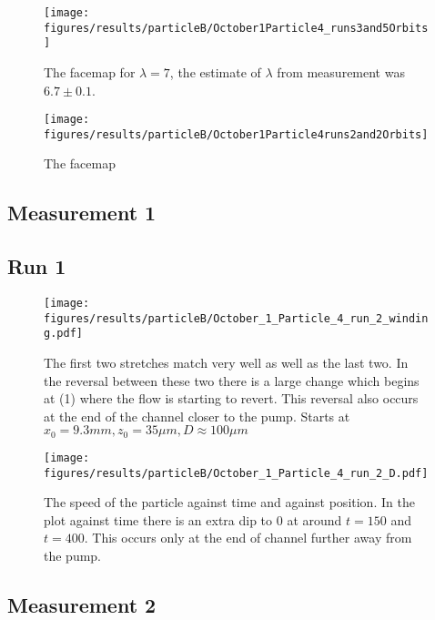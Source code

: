 


\begin{figure}[H]
\centering
\texttt{[image: figures/results/particleB/October1Particle4\_runs3and5Orbits]}
\caption{The facemap for $\lambda = 7$, the estimate of $\lambda$ from measurement was $6.7 \pm 0.1$.}
\label{fig:October1Particle4_runs3and5Orbits}
\end{figure}


\begin{figure}[H]
\centering
\texttt{[image: figures/results/particleB/October1Particle4runs2and2Orbits]}
\caption{The facemap}
\label{fig:October1Particle4runs2and2Orbits}
\end{figure}


\subsection{Measurement 1}
\subsection{Run 1}
\begin{figure}[H]
\begin{center}
\texttt{[image: figures/results/particleB/October\_1\_Particle\_4\_run\_2\_winding.pdf]}
\end{center}
\caption{The first two stretches match very well as well as the last two. In the reversal between these two there is a large change which begins at (1) where the flow is starting to revert. This reversal also occurs at the end of the channel closer to the pump. Starts at $ x_0 = 9.3 mm, z_0 = 35\mu m, D \approx 100\mu m$}
\label{fig:particleB1}
\end{figure}

\begin{figure}[H]
\begin{center}
\texttt{[image: figures/results/particleB/October\_1\_Particle\_4\_run\_2\_D.pdf]}
\end{center}
\caption{The speed of the particle against time and against position. In the plot against time there is an extra dip to 0 at around $t=150$ and $t=400$. This occurs only at the end of channel further away from the pump.}
\label{fig:particleB1speed}
\end{figure}

\subsection{Measurement 2}

